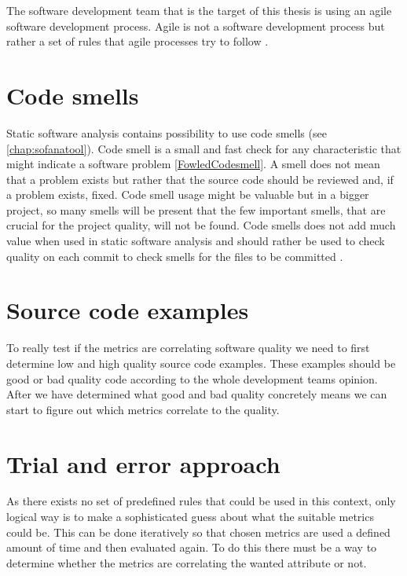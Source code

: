 The software development team that is the target of this thesis is using an agile software development process. Agile is not a software development process but rather a set of rules that agile processes try to follow \cite{agilemanifesto}.

\section{Code smells}

Static software analysis contains possibility to use code smells (see \autoref{chap:sofanatool}). Code smell is a small and fast check for any characteristic that might indicate a software problem \ref{FowledCodesmell}. A smell does not mean that a problem exists but rather that the source code should be reviewed and, if a problem exists, fixed. Code smell usage might be valuable but in a bigger project, so many smells will be present that the few important smells, that are crucial for the project quality, will not be found. Code smells does not add much value when used in static software analysis and should rather be used to check quality on each commit to check smells for the files to be committed \cite{tufano2015and}.

\section{Source code examples}
To really test if the metrics are correlating software quality we need to first determine low and high quality source code examples. These examples should be good or bad quality code according to the whole development teams opinion. After we have determined what good and bad quality concretely means we can start to figure out which metrics correlate to the quality. 

\section{Trial and error approach}
As there exists no set of predefined rules that could be used in this context, only logical way is to make a sophisticated guess about what the suitable metrics could be. This can be done iteratively so that chosen metrics are used a defined amount of time and then evaluated again. To do this there must be a way to determine whether the metrics are correlating the wanted attribute or not.





